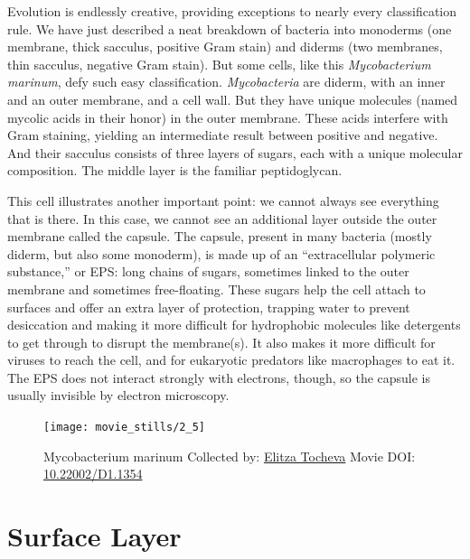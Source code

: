 \documentclass[]{tufte-book}
\begin{document}
Evolution is endlessly creative, providing exceptions to nearly every
classification rule. We have just described a neat breakdown of bacteria
into monoderms (one membrane, thick sacculus, positive Gram stain) and
diderms (two membranes, thin sacculus, negative Gram stain). But some
cells, like this \emph{Mycobacterium marinum}, defy such easy
classification. \emph{Mycobacteria} are diderm, with an inner and an
outer membrane, and a cell wall. But they have unique molecules (named
mycolic acids in their honor) in the outer membrane. These acids
interfere with Gram staining, yielding an intermediate result between
positive and negative. And their sacculus consists of three layers of
sugars, each with a unique molecular composition. The middle layer is
the familiar peptidoglycan.

This cell illustrates another important point: we cannot always see
everything that is there. In this case, we cannot see an additional
layer outside the outer membrane called the capsule. The capsule,
present in many bacteria (mostly diderm, but also some monoderm), is
made up of an ``extracellular polymeric substance,'' or EPS: long chains
of sugars, sometimes linked to the outer membrane and sometimes
free-floating. These sugars help the cell attach to surfaces and offer
an extra layer of protection, trapping water to prevent desiccation and
making it more difficult for hydrophobic molecules like detergents to
get through to disrupt the membrane(s). It also makes it more difficult
for viruses to reach the cell, and for eukaryotic predators like
macrophages to eat it. The EPS does not interact strongly with
electrons, though, so the capsule is usually invisible by electron
microscopy.





\begin{figure}
\texttt{[image: movie\_stills/2\_5]} \caption[Mycobacterium marinum Collected by:
\protect\hyperlink{elitza_tocheva}{Elitza Tocheva} Movie DOI:
\href{https://doi.org/10.22002/D1.1354}{10.22002/D1.1354}]{Mycobacterium marinum Collected by:
\protect\hyperlink{elitza_tocheva}{Elitza Tocheva} Movie DOI:
\href{https://doi.org/10.22002/D1.1354}{10.22002/D1.1354}}\label{fig:2-5}
\end{figure}

\section{Surface Layer}\label{surface-layer}
\end{document}

